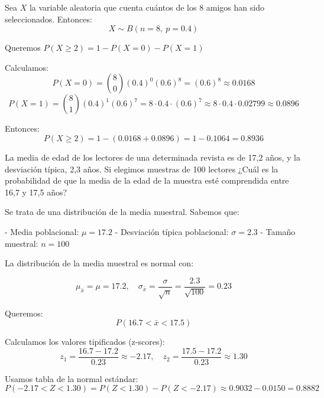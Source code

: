 \documentclass[addpoints,spanish, 12pt,a4paper]{exam}
\renewcommand*\half{.5}
\begin{document}
\begin{questions}
\begin{solution}
Sea \( X \) la variable aleatoria que cuenta cuántos de los 8 amigos han sido seleccionados. Entonces:
\[
X \sim B(n = 8,\ p = 0.4)
\]

Queremos \( P(X \geq 2) = 1 - P(X = 0) - P(X = 1) \)

Calculamos:
\[
P(X = 0) = \binom{8}{0}(0.4)^0(0.6)^8 = (0.6)^8 \approx 0.0168
\]
\[
P(X = 1) = \binom{8}{1}(0.4)^1(0.6)^7 = 8 \cdot 0.4 \cdot (0.6)^7 \approx 8 \cdot 0.4 \cdot 0.02799 \approx 0.0896
\]

Entonces:
\[
P(X \geq 2) = 1 - (0.0168 + 0.0896) = 1 - 0.1064 = \boxed{0.8936}
\]
\end{solution}



\question[1\half] La media de edad de los lectores de una determinada revista es de 17,2 años, y la desviación típica, 2,3 años. Si elegimos muestras de 100 lectores ¿Cuál es la probabilidad de que la media de la edad de la muestra esté comprendida entre 16,7 y 17,5 años?

\begin{solution}
Se trata de una distribución de la media muestral. Sabemos que:

- Media poblacional: \( \mu = 17.2 \)
- Desviación típica poblacional: \( \sigma = 2.3 \)
- Tamaño muestral: \( n = 100 \)

La distribución de la media muestral es normal con:

\[
\mu_{\bar{x}} = \mu = 17.2,\quad \sigma_{\bar{x}} = \frac{\sigma}{\sqrt{n}} = \frac{2.3}{\sqrt{100}} = 0.23
\]

Queremos:
\[
P(16.7 < \bar{x} < 17.5)
\]

Calculamos los valores tipificados (z-scores):
\[
z_1 = \frac{16.7 - 17.2}{0.23} \approx -2.17,\quad z_2 = \frac{17.5 - 17.2}{0.23} \approx 1.30
\]

Usamos tabla de la normal estándar:
\[
P(-2.17 < Z < 1.30) = P(Z < 1.30) - P(Z < -2.17)
\approx 0.9032 - 0.0150 = \boxed{0.8882}
\]
\end{solution}




\end{questions}
\end{document}
